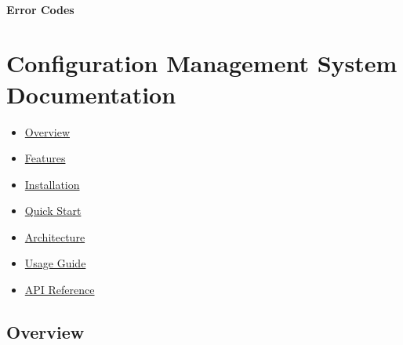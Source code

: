 \hypertarget{error-codes}{%
\paragraph{Error Codes}\label{error-codes}}

\begin{Shaded}
\begin{Highlighting}[]
\OperatorTok{=}\NormalTok{ \{}
\OperatorTok{:} \OperatorTok{,}
\OperatorTok{:} \OperatorTok{,}
\OperatorTok{:} \OperatorTok{,}
\OperatorTok{:} \OperatorTok{,}
\OperatorTok{:} \OperatorTok{,}
\OperatorTok{:} 
\NormalTok{\} } \OperatorTok{;}
\end{Highlighting}
\end{Shaded}

\hypertarget{configuration-management-system-documentation-1}{%
\section{Configuration Management System
Documentation}\label{configuration-management-system-documentation-1}}

\begin{itemize}
\tightlist
\item
  \protect\hyperlink{overview}{Overview}
\item
  \protect\hyperlink{features}{Features}
\item
  \protect\hyperlink{installation}{Installation}
\item
  \protect\hyperlink{quick-start}{Quick Start}
\item
  \protect\hyperlink{architecture}{Architecture}
\item
  \protect\hyperlink{usage-guide}{Usage Guide}
\item
  \protect\hyperlink{api-reference}{API Reference}
\end{itemize}

\hypertarget{overview-1}{%
\subsection{Overview}\label{overview-1}}

